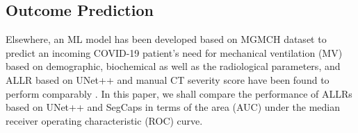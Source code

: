 





\subsection{Outcome Prediction}

Elsewhere, an ML model has been developed based on MGMCH dataset to predict an incoming COVID-19 patient's need for mechanical ventilation (MV) based on demographic, biochemical as well as the radiological parameters, and ALLR based on UNet++ and manual CT severity score have been found to perform comparably \cite{Sinha2022.01.30.22269998}. In this paper, we shall compare the performance of ALLRs based on UNet++ and SegCaps in terms of the area (AUC) under the median receiver operating characteristic (ROC) curve.



